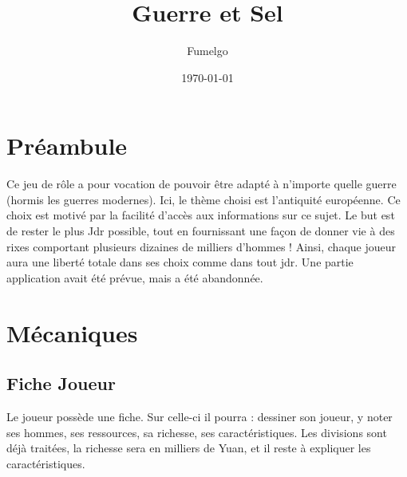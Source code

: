 \documentclass[french]{article}
\begin{document}
\title{\textbf{Guerre et Sel}}
\date{\today}
\author{Fumelgo}

\maketitle
\newpage

\tableofcontents

\newpage


\section{Préambule}

Ce jeu de rôle a pour vocation de pouvoir être adapté à n'importe quelle guerre (hormis les guerres modernes). Ici, le thème choisi est l'antiquité européenne. Ce choix est motivé par la facilité d'accès aux informations sur ce sujet. Le but est de rester le plus Jdr possible, tout en fournissant une façon de donner vie à des rixes comportant plusieurs dizaines de milliers d'hommes !
Ainsi, chaque joueur aura une liberté totale dans ses choix comme dans tout jdr. Une partie application avait été prévue, mais a été abandonnée.


\section{Mécaniques}

\subsection{Fiche Joueur}

Le joueur possède une fiche. Sur celle-ci il pourra : dessiner son joueur, y noter ses hommes, ses ressources, sa richesse, ses caractéristiques. Les divisions sont déjà traitées, la richesse sera en milliers de Yuan, et il reste à expliquer les caractéristiques.
\end{document}
